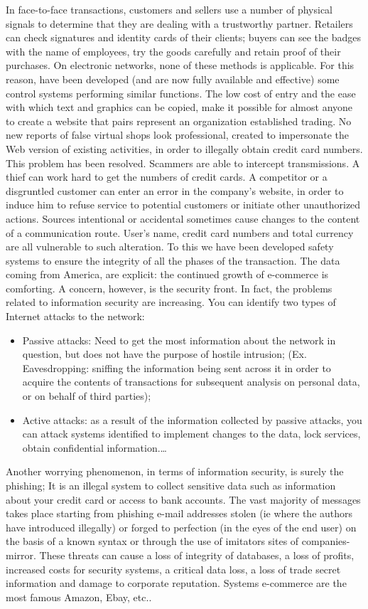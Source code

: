 In face-to-face transactions, customers and sellers use a number of physical signals to determine that they are dealing with a trustworthy partner. Retailers can check signatures and identity cards of their clients; buyers can see the badges with the name of employees, try the goods carefully and retain proof of their purchases. On electronic networks, none of these methods is applicable. For this reason, have been developed (and are now fully available and effective) some control systems performing similar functions.
The low cost of entry and the ease with which text and graphics can be copied, make it possible for almost anyone to create a website that pairs represent an organization established trading. No new reports of false virtual shops look professional, created to impersonate the Web version of existing activities, in order to illegally obtain credit card numbers. This problem has been resolved. Scammers are able to intercept transmissions. A thief can work hard to get the numbers of credit cards. A competitor or a disgruntled customer can enter an error in the company's website, in order to induce him to refuse service to potential customers or initiate other unauthorized actions. Sources intentional or accidental sometimes cause changes to the content of a communication route. User's name, credit card numbers and total currency are all vulnerable to such alteration. To this we have been developed safety systems to ensure the integrity of all the phases of the transaction. The data coming from America, are explicit: the continued growth of e-commerce is comforting. A concern, however, is the security front. In fact, the problems related to information security are increasing.
\newline
You can identify two types of Internet attacks to the network:
\begin{itemize}
  \item Passive attacks: Need to get the most information about the network in question, but does not have the purpose of hostile intrusion; (Ex. Eavesdropping: sniffing the information being sent across it in order to acquire the contents of transactions for subsequent analysis on personal data, or on behalf of third parties);
  \item Active attacks: as a result of the information collected by passive attacks, you can attack systems identified to implement changes to the data, lock services, obtain confidential information.\ldots
\end{itemize}
Another worrying phenomenon, in terms of information security, is
surely the phishing; It is an illegal system to collect sensitive data such as information about your credit card or access to bank accounts. The vast majority of messages takes place starting from phishing e-mail addresses stolen (ie where the authors have introduced illegally) or forged to perfection (in the eyes of the end user) on the basis of a known syntax or through the use of imitators sites of companies-mirror. These threats can cause a loss of integrity of databases, a loss of profits, increased costs for security systems, a critical data loss, a loss of trade secret information and damage to corporate reputation.
Systems e-commerce are the most famous Amazon, Ebay, etc..

